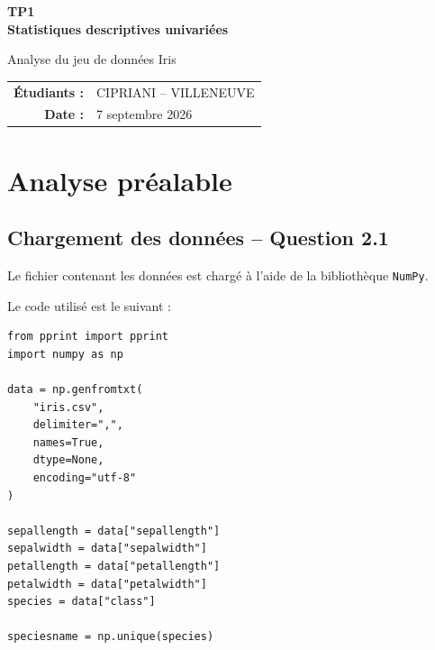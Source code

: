\documentclass[12pt,a4paper]{article}
\begin{document}

\begin{titlepage}

    \centering

    \vspace*{2cm}

    \vspace{2cm}

    {\Huge\bfseries
    TP1\\[0.3cm]
    Statistiques descriptives univariées
    \par}

    \vspace{1cm}

    {\Large
    Analyse du jeu de données Iris
    \par}

    \vfill

    \begin{tabular}{rl}
        \textbf{Étudiants :} & CIPRIANI -- VILLENEUVE \\
        \textbf{Date :} & 7 septembre 2026
    \end{tabular}

    \vfill

\end{titlepage}

\tableofcontents
\newpage



\section{Analyse préalable}

\subsection{Chargement des données -- Question 2.1}

Le fichier contenant les données est chargé à l'aide de la bibliothèque
\texttt{NumPy}.

Le code utilisé est le suivant :

\begin{lstlisting}
from pprint import pprint
import numpy as np

data = np.genfromtxt(
    "iris.csv",
    delimiter=",",
    names=True,
    dtype=None,
    encoding="utf-8"
)

sepallength = data["sepallength"]
sepalwidth = data["sepalwidth"]
petallength = data["petallength"]
petalwidth = data["petalwidth"]
species = data["class"]

speciesname = np.unique(species)
\end{lstlisting}
\end{document}
